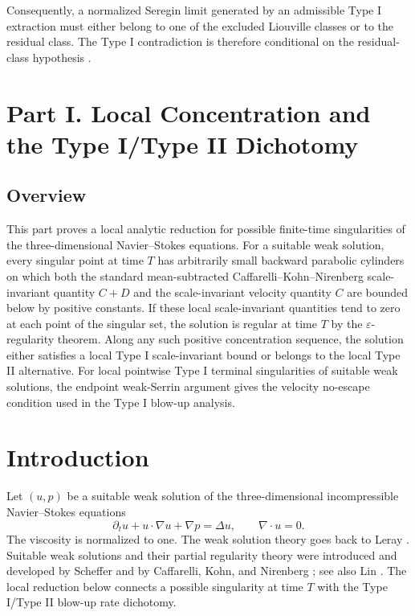 \documentclass[11pt]{amsart}
\theoremstyle{plain}
\theoremstyle{definition}
\theoremstyle{remark}
\numberwithin{equation}{section}
\begin{document}
Consequently, a normalized Seregin limit generated by an admissible Type I
extraction must either belong to one of the excluded Liouville classes or to
the residual class.  The Type I contradiction is therefore conditional on the
residual-class hypothesis .

\clearpage
\section*{Part I. Local Concentration and the Type I/Type II Dichotomy}

\subsection*{Overview}

This part proves a local analytic reduction for possible finite-time
singularities of the three-dimensional Navier--Stokes equations.  For a
suitable weak solution,
every singular point at time \(T\) has arbitrarily small backward parabolic
cylinders on which both the standard mean-subtracted
Caffarelli--Kohn--Nirenberg scale-invariant quantity \(C+D\) and the
scale-invariant velocity quantity \(C\) are bounded below by positive
constants.  If these local scale-invariant quantities tend to zero at each
point of the singular set, the solution is regular at time \(T\) by the
\(\varepsilon\)-regularity theorem.  Along any such positive concentration
sequence, the solution either satisfies a local Type I scale-invariant bound or
belongs to the local Type II alternative.  For local pointwise Type I terminal
singularities of suitable weak solutions, the endpoint weak-Serrin argument gives
the velocity no-escape condition
used in the Type I blow-up analysis.

\section{Introduction}

Let \((u,p)\) be a suitable weak solution of the three-dimensional
incompressible Navier--Stokes equations
\[
  \partial_t u+u\cdot\nabla u+\nabla p=\Delta u,
  \qquad \nabla\cdot u=0.
\]
The viscosity is normalized to one.  The weak
solution theory goes back to Leray \cite{Leray1934}.  Suitable weak solutions
and their partial regularity theory were introduced and developed by Scheffer
\cite{Scheffer1976} and by Caffarelli, Kohn, and Nirenberg \cite{CKN1982}; see
also Lin \cite{Lin1998}.  The local reduction below connects a possible
singularity at time \(T\) with the Type I/Type II blow-up rate dichotomy.
\end{document}
